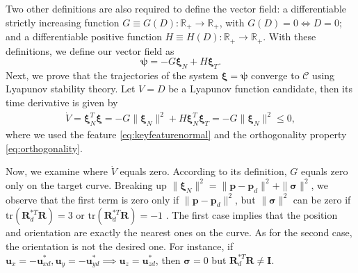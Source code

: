 Two other definitions are also required to define the vector field: a differentiable strictly increasing function $G\equiv G(D):\mathbb{R}_+\to\mathbb{R}_+$, with $G(D)=0\iff D=0$; and a differentiable positive function $H\equiv H(D):\mathbb{R}_+\to\mathbb{R}_+$. With these definitions, we define our vector field as
\begin{equation}
    \boldsymbol{\psi} = -G\boldsymbol{\xi}_N +H\boldsymbol{\xi}_T. \label{eq:vectorfield}
\end{equation}
Next, we prove that the trajectories of the system $\boldsymbol{\xi}=\boldsymbol{\psi}$ converge to $\mathcal{C}$ using Lyapunov stability theory. Let $V=D$ be a Lyapunov function candidate, then its time derivative is given by
\begin{align}
    \dot{V} = \boldsymbol{\xi}_N^T\boldsymbol{\xi} = -G\|\boldsymbol{\xi}_N\|^2 + H\boldsymbol{\xi}_N^T\boldsymbol{\xi}_T = -G\|\boldsymbol{\xi}_N\|^2\le0,
\end{align}
where we used the feature \eqref{eq:keyfeaturenormal} and the orthogonality property \eqref{eq:orthogonality}.

Now, we examine where $\dot{V}$ equals zero. According to its definition, $G$ equals zero only on the target curve. Breaking up $\|\boldsymbol{\xi}_N\|^2 = \|\mathbf{p} - \mathbf{p}_d\|^2 + \| \boldsymbol{\sigma}\|^2$, we observe that the first term is zero only if $\|\mathbf{p} - \mathbf{p}_d\|^2$, but $\|\boldsymbol{\sigma}\|^2$ can be zero if $\text{tr}(\mathbf{R}_d^{*T}\mathbf{R})=3$ or $\text{tr}(\mathbf{R}_d^{*T}\mathbf{R})=-1$ \citep{Culbertson2021}. The first case implies that the position and orientation are exactly the nearest ones on the curve. As for the second case, the orientation is not the desired one. For instance, if $\mathbf{u}_x = -\mathbf{u}_{xd}^*, \mathbf{u}_y = -\mathbf{u}_{yd}^*\implies \mathbf{u}_z = \mathbf{u}_{zd}^*$, then $\boldsymbol{\sigma}=0$ but $\mathbf{R}_d^{*T}\mathbf{R}\neq \mathbf{I}$. 

